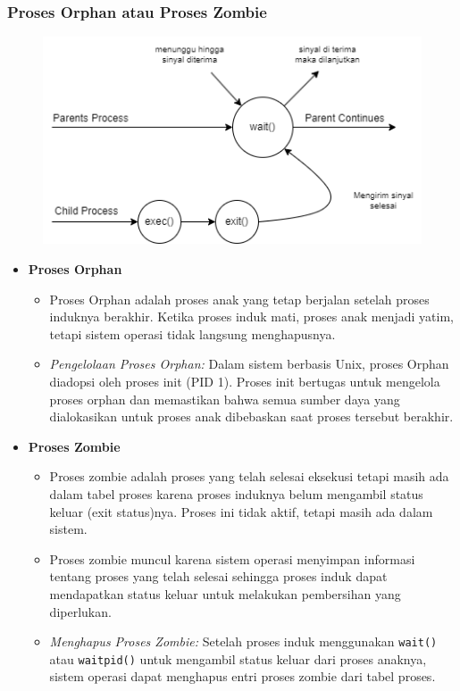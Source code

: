 \documentclass[12pt]{article}
\begin{document}
\begin{itemize}
    \subsubsection{Proses Orphan atau Proses Zombie}
    \begin{figure}[h]
		\centering
		\includegraphics[width=1\textwidth]{asset/Process.png}
		\label{fig:gambar}
    \end{figure}
    \begin{itemize}
        \item \textbf{Proses Orphan}
        \begin{itemize}
            \item Proses Orphan adalah proses anak yang tetap berjalan setelah proses induknya berakhir. Ketika proses induk mati, proses anak menjadi yatim, tetapi sistem operasi tidak langsung menghapusnya.
            \item \textit{Pengelolaan Proses Orphan:}  
            Dalam sistem berbasis Unix, proses Orphan diadopsi oleh proses init (PID 1). Proses init bertugas untuk mengelola proses orphan dan memastikan bahwa semua sumber daya yang dialokasikan untuk proses anak dibebaskan saat proses tersebut berakhir.
        \end{itemize}
        \item \textbf{Proses Zombie}
        \begin{itemize}
            \item Proses zombie adalah proses yang telah selesai eksekusi tetapi masih ada dalam tabel proses karena proses induknya belum mengambil status keluar (exit status)nya. Proses ini tidak aktif, tetapi masih ada dalam sistem.
            \item Proses zombie muncul karena sistem operasi menyimpan informasi tentang proses yang telah selesai sehingga proses induk dapat mendapatkan status keluar untuk melakukan pembersihan yang diperlukan.
            \item \textit{Menghapus Proses Zombie:}  
            Setelah proses induk menggunakan \texttt{wait()} atau \texttt{waitpid()} untuk mengambil status keluar dari proses anaknya, sistem operasi dapat menghapus entri proses zombie dari tabel proses.
        \end{itemize}
    \end{itemize}


\end{itemize}
\end{document}
